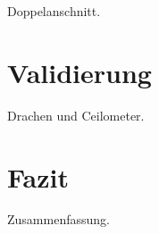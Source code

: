\documentclass[a4paper,11pt,twoside,german]{article}
\newcommand{\literaturverzeichnis}[1]{
    \renewcommand{\harvardand}{und} %
    
    }
\begin{document}
Doppelanschnitt.
\blindtext[2]


\section{Validierung}

Drachen und Ceilometer.
\blindtext[3]




\section{Fazit}

Zusammenfassung.
\blindtext[3]


\literaturverzeichnis{bibliography.bib} %
\end{document}
